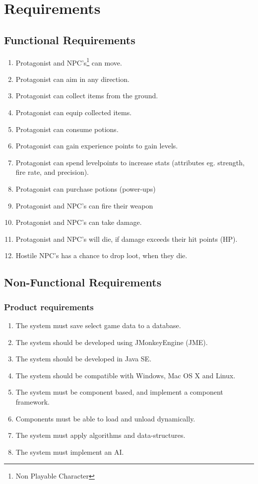 \documentclass[11pt]{article}
\begin{document}
\section*{Requirements}
\subsection*{Functional Requirements}
\begin{enumerate}[F01]
	\item Protagonist and NPC's\footnote{Non Playable Character} can move.
	\item Protagonist can aim in any direction.
	\item Protagonist can collect items from the ground.
	\item Protagonist can equip collected items.
	\item Protagonist can consume potions.
	\item Protagonist can gain experience points to gain levels.
	\item Protagonist can spend levelpoints to increase stats (attributes eg. strength, fire rate, and precision).
	\item Protagonist can purchase potions (power-ups)
	\item Protagonist and NPC's can fire their weapon
	\item Protagonist and NPC's can take damage.
	\item Protagonist and NPC's will die, if damage exceeds their hit points (HP).
	\item Hostile NPC's has a chance to drop loot, when they die.

\end{enumerate}
\subsection*{Non-Functional Requirements}
\subsubsection*{Product requirements}
\begin{enumerate}[P01]
	\item The system must save select game data to a database.
	\item The system should be developed using JMonkeyEngine (JME).
	\item The system should be developed in Java SE.
	\item The system should be compatible with Windows, Mac OS X and Linux.
 	\item The system must be component based, and implement a component framework.
 	\item Components must be able to load and unload dynamically.
 	\item The system must apply algorithms and data-structures.
	\item The system must implement an AI.
\end{enumerate}
\end{document}
